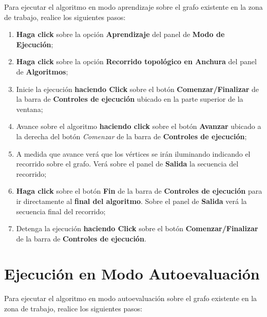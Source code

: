 \documentclass{book}
\begin{document}
Para ejecutar el algoritmo en modo aprendizaje sobre el grafo existente en la zona de trabajo, realice los siguientes pasos:
\medskip

\begin{enumerate}
	\itemsep=8pt \topsep=0pt \partopsep=0pt \parskip=0pt \parsep=0pt

	\item \textbf{Haga click} sobre la opción \textbf{Aprendizaje} del panel de \textbf{Modo de Ejecución};

	\item \textbf{Haga click} sobre la opción \textbf{Recorrido topológico en Anchura} del panel de \textbf{Algoritmos};

	\item Inicie la ejecución \textbf{haciendo Click} sobre el botón \textbf{Comenzar/Finalizar} de la barra de \textbf{Controles de ejecución} ubicado en la parte superior de la ventana;

	\item Avance sobre el algoritmo \textbf{haciendo click} sobre el botón \textbf{Avanzar} ubicado a la derecha del botón \textit{Comenzar} de la barra de \textbf{Controles de ejecución};

	\item A medida que avance verá que los vértices se irán iluminando indicando el recorrido sobre el grafo. Verá sobre el panel de \textbf{Salida} la secuencia del recorrido;

	\item \textbf{Haga click} sobre el botón \textbf{Fin} de la barra de \textbf{Controles de ejecución} para ir directamente al \textbf{final del algoritmo}. Sobre el panel de \textbf{Salida} verá la secuencia final del recorrido;

	\item Detenga la ejecución \textbf{haciendo Click} sobre el botón \textbf{Comenzar/Finalizar} de la barra de \textbf{Controles de ejecución}.

\end{enumerate}
\medskip



\section{Ejecución en Modo Autoevaluación}

Para ejecutar el algoritmo en modo autoevaluación sobre el grafo existente en la zona de trabajo, realice los siguientes pasos:
\medskip
\end{document}
